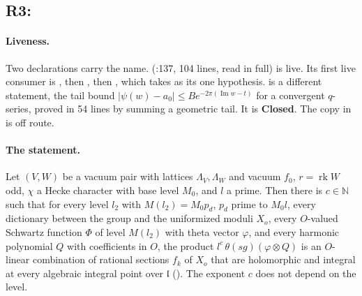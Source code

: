 \documentclass[11pt]{article}
\newcommand{\sC}{\textbf{Closed}}
\theoremstyle{remark}
\begin{document}
\subsection{R3: }\label{sec:fu4r3}

\paragraph{Liveness.} Two declarations carry the name.  (:137, 104 lines, read in full) is live. Its first live consumer is , then , then , which takes  as its one hypothesis.  is a different statement, the tail bound $\lvert\psi(w)-a_0\rvert\le Be^{-2\pi(\operatorname{Im}w-t)}$ for a convergent $q$-series, proved in 54 lines by summing a geometric tail. It is \sC. The copy in  is off route.

\paragraph{The statement.} Let $(V,W)$ be a vacuum pair with lattices $\Lambda_V,\Lambda_W$ and vacuum $f_0$, $r=\operatorname{rk}W$ odd, $\chi$ a Hecke character with base level $M_0$, and $l$ a prime. Then there is $c\in\mathbb N$ such that for every level $l_2$ with $M(l_2)=M_0p_d$, $p_d$ prime to $M_0l$, every dictionary between the group and the uniformized moduli $X_o$, every $O$-valued Schwartz function $\Phi$ of level $M(l_2)$ with theta vector $\varphi$, and every harmonic polynomial $Q$ with coefficients in $O$, the product $l^c\,\theta(s g)(\varphi\otimes Q)$ is an $O$-linear combination of rational sections $f_k$ of $X_o$ that are holomorphic and integral at every algebraic integral point over $\mathfrak l$ (). The exponent $c$ does not depend on the level.
\end{document}

